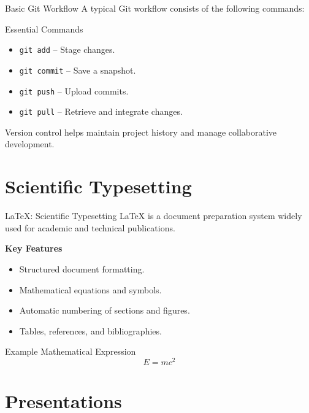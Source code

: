 \documentclass[aspectratio=169,11pt]{beamer}
\begin{document}
\begin{frame}{Basic Git Workflow}
    A typical Git workflow consists of the following commands:

    \begin{block}{Essential Commands}
        \begin{itemize}
            \item \texttt{git add} -- Stage changes.
            \item \texttt{git commit} -- Save a snapshot.
            \item \texttt{git push} -- Upload commits.
            \item \texttt{git pull} -- Retrieve and integrate changes.
        \end{itemize}
    \end{block}

    Version control helps maintain project history
    and manage collaborative development.
\end{frame}

\section{Scientific Typesetting}

\begin{frame}{LaTeX: Scientific Typesetting}
    LaTeX is a document preparation system widely used
    for academic and technical publications.

    \textbf{Key Features}
    \begin{itemize}
        \item Structured document formatting.
        \item Mathematical equations and symbols.
        \item Automatic numbering of sections and figures.
        \item Tables, references, and bibliographies.
    \end{itemize}

    \begin{block}{Example Mathematical Expression}
        \[
        E = mc^2
        \]
    \end{block}
\end{frame}

\section{Presentations}
\end{document}
